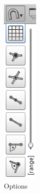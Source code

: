 \documentclass[a4paper,11pt]{report}
\begin{document}
\begin{minipage}[h]{4cm}
\begin{figure}[H]
\begin{center}
\includegraphics[scale=0.6]{./pictures/snap_opt.png}
\caption{Options}
\label{pic:snap_opt}
\end{center}
\end{figure}
\end{minipage}
\end{document}
